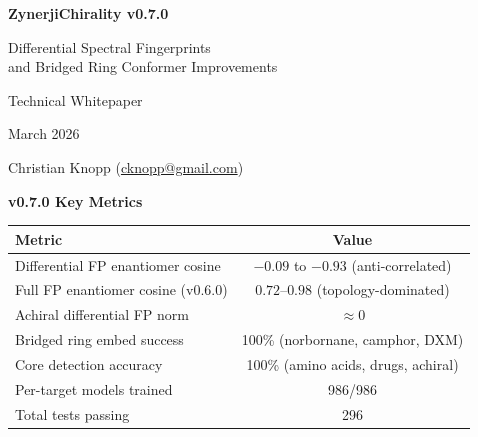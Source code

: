 \documentclass[11pt,a4paper]{article}
\begin{document}
\begin{titlepage}
\centering
\vspace*{1.5cm}

{\Huge\bfseries\color{zynerji} ZynerjiChirality v0.7.0\par}
\vspace{0.5cm}
{\Large\color{darktext} Differential Spectral Fingerprints\\and Bridged Ring Conformer Improvements\par}

\vspace{1.5cm}

{\large\color{gray} Technical Whitepaper\par}
\vspace{0.3cm}
{\normalsize March 2026\par}
\vspace{0.3cm}
{\normalsize Christian Knopp (\href{mailto:cknopp@gmail.com}{cknopp@gmail.com})\par}

\vspace{2cm}

\begin{keyresult}
\centering
\textbf{v0.7.0 Key Metrics}

\vspace{0.5cm}

\begin{tabular}{lc}
\toprule
\textbf{Metric} & \textbf{Value} \\
\midrule
Differential FP enantiomer cosine & $-0.09$ to $-0.93$ (anti-correlated) \\
Full FP enantiomer cosine (v0.6.0) & $0.72$--$0.98$ (topology-dominated) \\
Achiral differential FP norm & $\approx 0$ \\
Bridged ring embed success & 100\% (norbornane, camphor, DXM) \\
Core detection accuracy & 100\% (amino acids, drugs, achiral) \\
Per-target models trained & 986/986 \\
Total tests passing & 296 \\
\bottomrule
\end{tabular}
\end{keyresult}

\vspace{1cm}

\begin{abstract}
\noindent
ZynerjiChirality v0.7.0 introduces the \textbf{chirality differential fingerprint}, a 128-dimensional spectral embedding that isolates the chirality signal from shared molecular topology. The v0.6.0 full fingerprint concatenated 8 sub-vectors (8$k$ raw dimensions), of which 6 encode topology shared between enantiomers, resulting in cosine similarities of 0.87--0.99 for enantiomer pairs---far from the theoretical $-1.0$. The differential fingerprint uses only the 2 chirality-sensitive sub-vectors (diff\_cos and diff\_sin), which flip sign between enantiomers by construction, yielding cosine $< 0.5$ and near-zero norm for achiral molecules.


\end{abstract}
\end{titlepage}
\end{document}
